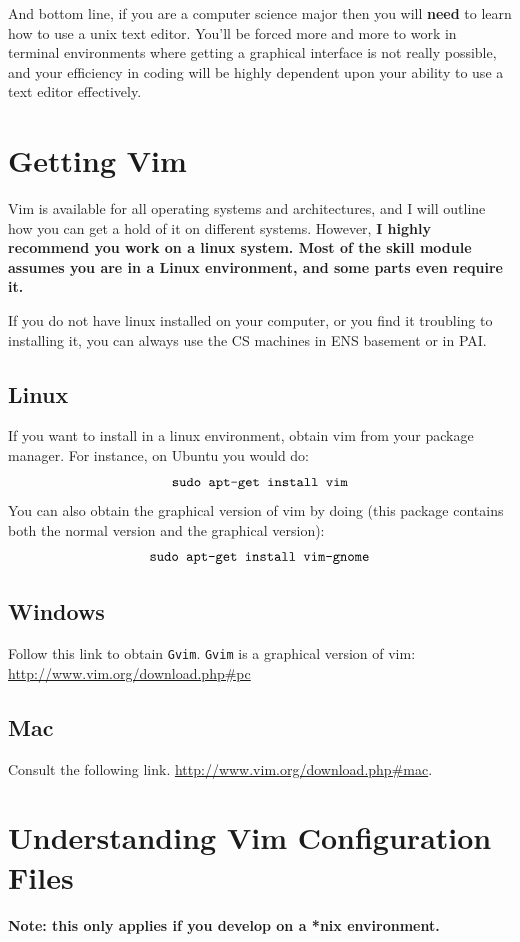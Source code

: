 And bottom line, if you are a computer science major then you will {\bf need}
to learn how to use a unix text editor. You'll be forced more and more
to work in terminal environments where getting a graphical interface is not
really possible, and your efficiency in coding will be highly dependent
upon your ability to use a text editor effectively.

\section{Getting Vim}
Vim is available for all operating systems and architectures, and I will
outline how you can get a hold of it on different systems. However, 
{\bf I highly recommend you work on a linux system. Most of the skill module 
assumes you are in a Linux environment, and some parts even require it.}

If you do not have linux installed on your computer, or you find it troubling
to installing it, you can always use the CS machines in ENS basement or 
in PAI.

\subsection{Linux}
If you want to install in a linux environment, obtain vim from your package 
manager. For instance, on Ubuntu you would do:
$$\text{\texttt{sudo apt-get install vim}}$$
You can also obtain the graphical version of vim by doing (this package
contains both the normal version and the graphical version):
$$\text{\texttt{sudo apt-get install vim-gnome}}$$

\subsection{Windows}
Follow this link to obtain \texttt{Gvim}. \texttt{Gvim} is a graphical
version of vim:
\url{http://www.vim.org/download.php#pc}

\subsection{Mac}
Consult the following link. \url{http://www.vim.org/download.php#mac}.

\section{Understanding Vim Configuration Files}
{\bf Note: this only applies if you develop on a *nix environment.}

